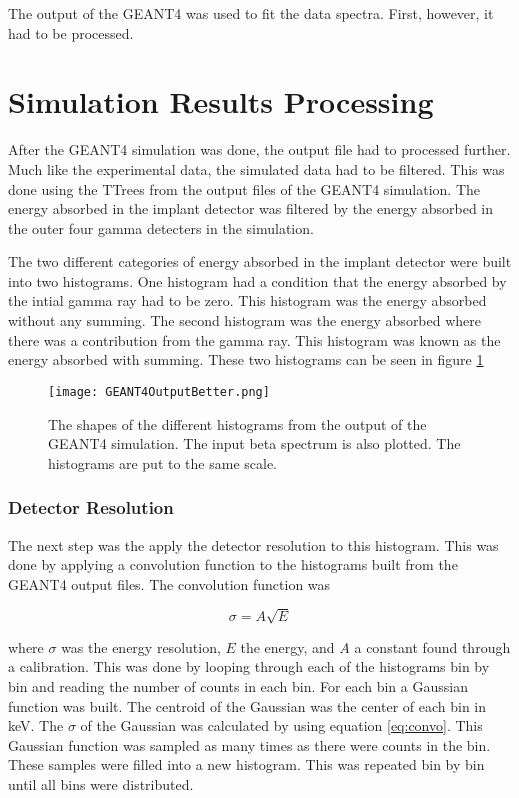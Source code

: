 

The output of the GEANT4 was used to fit the data spectra. 
First, however, it had to be processed. 

\section{Simulation Results Processing}
After the GEANT4 simulation was done, the output file had to processed further.  
Much like the experimental data, the simulated data had to be filtered.
This was done using the TTrees from the output files of the GEANT4 simulation.
The energy absorbed in the implant detector was filtered by the energy absorbed in the outer four gamma detecters in the simulation.

The two different categories of energy absorbed in the implant detector were built into two histograms. 
One histogram had a condition that the energy absorbed by the intial gamma ray had to be zero.
This histogram was the energy absorbed without any summing.
The second histogram was the energy absorbed where there was a contribution from the gamma ray.
This histogram was known as the energy absorbed with summing.
These two histograms can be seen in figure \ref{fig:GEANT4Hists}

\begin{figure}[!htb]
	\centerline{\texttt{[image: GEANT4OutputBetter.png]}}
	\caption{The shapes of the different histograms from the output of the GEANT4 simulation.
		 The input beta spectrum is also plotted.
		 The histograms are put to the same scale.}
	\label{fig:GEANT4Hists}
\end{figure}

\subsubsection{Detector Resolution}
\label{sec:convolution}
The next step was the apply the detector resolution to this histogram.
This was done by applying a convolution function to the histograms built from the GEANT4 output files.
The convolution function was

\begin{equation}
	\sigma = A\sqrt{E}
	\label{eq:convo}
\end{equation}

where $\sigma$ was the energy resolution, $E$ the energy, and $A$ a constant found through a calibration.
This was done by looping through each of the histograms bin by bin and reading the number of counts in each bin.
For each bin a Gaussian function was built.
The centroid of the Gaussian was the center of each bin in keV.
The $\sigma$ of the Gaussian was calculated by using equation \ref{eq:convo}.
This Gaussian function was sampled as many times as there were counts in the bin.
These samples were filled into a new histogram.
This was repeated bin by bin until all bins were distributed.


